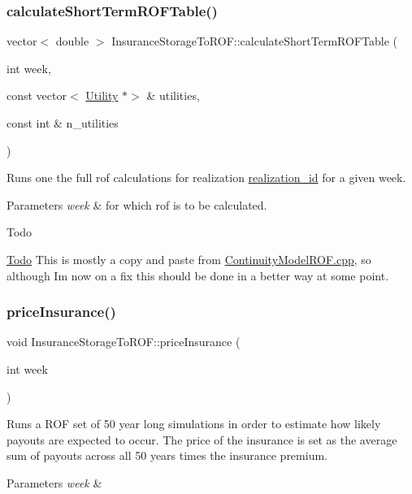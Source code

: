 \subsubsection{\texorpdfstring{calculate\+Short\+Term\+R\+O\+F\+Table()}{calculateShortTermROFTable()}}
{\footnotesize\ttfamily vector$<$ double $>$ Insurance\+Storage\+To\+R\+O\+F\+::calculate\+Short\+Term\+R\+O\+F\+Table (\begin{DoxyParamCaption}\item[{int}]{week,  }\item[{const vector$<$ \mbox{\hyperlink{classUtility}{Utility}} $\ast$$>$ \&}]{utilities,  }\item[{const int \&}]{n\+\_\+utilities }\end{DoxyParamCaption})}

Runs one the full rof calculations for realization \mbox{\hyperlink{classContinuityModel_a7b6c99bf256f6c6b633ebb78282f43c7}{realization\+\_\+id}} for a given week. 
\begin{DoxyParams}{Parameters}
{\em week} & for which rof is to be calculated. \\
\hline
\end{DoxyParams}
\begin{DoxyRefDesc}{Todo}
\item[\mbox{\hyperlink{todo__todo000002}{Todo}}]This is mostly a copy and paste from \mbox{\hyperlink{ContinuityModelROF_8cpp}{Continuity\+Model\+R\+O\+F.\+cpp}}, so although I\textquotesingle{}m now on a fix this should be done in a better way at some point. \end{DoxyRefDesc}
\mbox{\label{classInsuranceStorageToROF_a2519f93b9db551105d9a7913d0db9540}} 
\subsubsection{\texorpdfstring{price\+Insurance()}{priceInsurance()}}
{\footnotesize\ttfamily void Insurance\+Storage\+To\+R\+O\+F\+::price\+Insurance (\begin{DoxyParamCaption}\item[{int}]{week }\end{DoxyParamCaption})}

Runs a R\+OF set of 50 year long simulations in order to estimate how likely payouts are expected to occur. The price of the insurance is set as the average sum of payouts across all 50 years times the insurance premium. 
\begin{DoxyParams}{Parameters}
{\em week} & \\
\hline
\end{DoxyParams}
\mbox{\label{classInsuranceStorageToROF_a6318c3dca8b0c4d568eac494e5ccf712}} 
